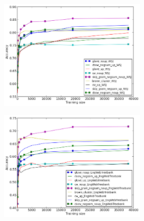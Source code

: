 \begin{figure}
\caption{POS-Tagging out-of-vocabulary-words accuracy for \textit{in-domain} and \textit{out-of-domain} test sets}
\centering
\begin{subfigure}{.5\textwidth}
	\centering
    	\includegraphics[width=0.8\textwidth]{plots/POSoutOfVocIN.png}
	\label{fig:inpos}
\end{subfigure}
\begin{subfigure}{.5\textwidth}
	\centering
    	\includegraphics[width=0.8\textwidth]{plots/POSoutOfVocOUT.png}
	\label{fig:outpos}
\end{subfigure}  	
\end{figure} 


